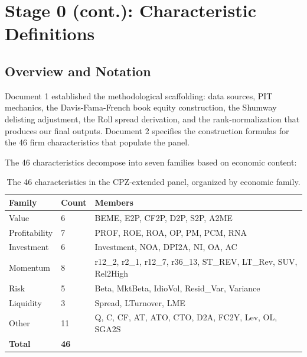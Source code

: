 %
%

\section{Stage 0 (cont.): Characteristic Definitions}
\label{sec:stage0-chars}

\subsection{Overview and Notation}
\label{subsec:stage0-chars-overview}

Document 1 established the methodological scaffolding: data sources,
PIT mechanics, the Davis-Fama-French book equity construction, the
Shumway delisting adjustment, the Roll spread derivation, and the
rank-normalization that produces our final outputs. Document 2 specifies
the construction formulas for the 46 firm characteristics that populate
the panel.

The 46 characteristics decompose into seven families based on economic
content:

\begin{table}[!ht]
\centering
\small
\begin{tabular}{lll}
\toprule
\textbf{Family} & \textbf{Count} & \textbf{Members} \\
\midrule
Value & 6 & BEME, E2P, CF2P, D2P, S2P, A2ME \\
Profitability & 7 & PROF, ROE, ROA, OP, PM, PCM, RNA \\
Investment & 6 & Investment, NOA, DPI2A, NI, OA, AC \\
Momentum & 8 & r12\_2, r2\_1, r12\_7, r36\_13, ST\_REV, LT\_Rev, SUV, Rel2High \\
Risk & 5 & Beta, MktBeta, IdioVol, Resid\_Var, Variance \\
Liquidity & 3 & Spread, LTurnover, LME \\
Other & 11 & Q, C, CF, AT, ATO, CTO, D2A, FC2Y, Lev, OL, SGA2S \\
\midrule
\textbf{Total} & \textbf{46} & \\
\bottomrule
\end{tabular}
\caption{The 46 characteristics in the CPZ-extended panel, organized by
economic family.}
\label{tab:char-families}
\end{table}

